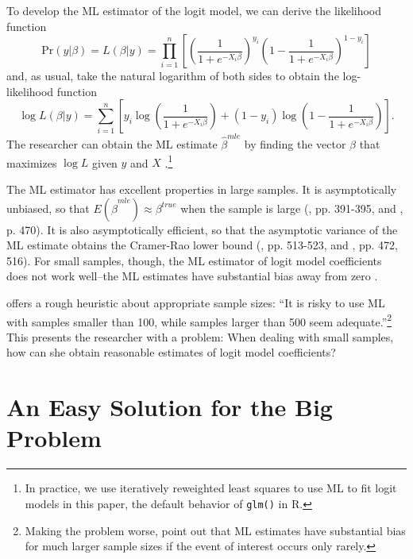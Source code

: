 \documentclass[12pt]{article}
\begin{document}
To develop the ML estimator of the logit model, we can derive the likelihood function
\begin{equation}\nonumber
\text{Pr}(y | \beta) = L(\beta | y) = \displaystyle \prod_{i = 1}^n \left[\left( \dfrac{1}{1 + e^{-X_i\beta}}\right)^{y_i}\left(1- \dfrac{1}{1 + e^{-X_i\beta}}\right)^{1 - y_i}\right]
\end{equation}
\noindent and, as usual, take the natural logarithm of both sides to obtain the log-likelihood function
\begin{equation}\nonumber
\log L(\beta | y) = \displaystyle \sum_{i = 1}^n \left[y_i \log \left( \dfrac{1}{1 + e^{-X_i\beta}}\right) + (1 - y_i) \log \left(1- \dfrac{1}{1 + e^{-X_i\beta}}\right)\right].
\end{equation}
\noindent The researcher can obtain the ML estimate $\hat{\beta}^{mle}$ by finding the vector $\beta$ that maximizes $\log L$ given $y$ and $X$ \citep{King1989}.\footnote{In practice, we use iteratively reweighted least squares to use ML to fit logit models in this paper, the default behavior of \texttt{glm()} in R.}

The ML estimator has excellent properties in large samples. It is asymptotically unbiased, so that $E(\hat{\beta}^{mle}) \approx \beta^{true}$ when the sample is large (\citealt{Wooldridge2002}, pp. 391-395, and \citealt{CasellaBerger2002}, p. 470). 
It is also asymptotically efficient, so that the asymptotic variance of the ML estimate obtains the Cramer-Rao lower bound (\citealt{Greene2012}, pp. 513-523, and \citealt{CasellaBerger2002}, pp. 472, 516). 
For small samples, though, the ML estimator of logit model coefficients does not work well--the ML estimates have substantial bias away from zero \citep[pp. 53-54]{Long1997}.

\citet[p. 54]{Long1997} offers a rough heuristic about appropriate sample sizes: ``It is risky to use ML with samples smaller than 100, while samples larger than 500 seem adequate.''\footnote{Making the problem worse, \cite{KingZeng2001} point out that ML estimates have substantial bias for much larger sample sizes if the event of interest occurs only rarely.}
This presents the researcher with a problem: When dealing with small samples, how can she obtain reasonable estimates of logit model coefficients?

\section*{An Easy Solution for the Big Problem}
\end{document}
